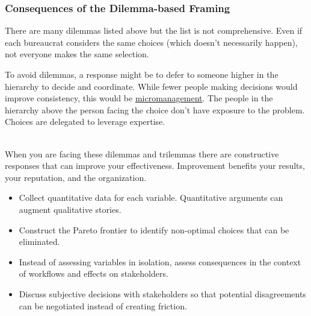 \subsubsection*{Consequences of the Dilemma-based Framing}

There are many dilemmas listed above but the list is not comprehensive. Even if each bureaucrat considers the same choices (which doesn't necessarily happen), not everyone makes the same selection. 

To avoid dilemmas, a response might be to defer to someone higher in the hierarchy to decide and coordinate. While fewer people making decisions would improve consistency, this would be \href{https://en.wikipedia.org/wiki/Micromanagement}{micromanagement}. 
The people in the hierarchy above the person facing the choice don't have exposure to the problem. Choices are delegated to leverage expertise. 

\ \\

When you are facing these dilemmas and trilemmas
there are constructive responses that can improve your effectiveness. Improvement benefits your results, your reputation, and the organization. 
\begin{itemize}
    \item Collect quantitative data for each variable. Quantitative arguments can augment qualitative stories. 
    \item Construct the Pareto frontier to identify non-optimal choices that can be eliminated.
    \item Instead of assessing variables in isolation, assess consequences in the context of workflows and effects on stakeholders.
    \item Discuss subjective decisions with stakeholders so that potential disagreements can be negotiated instead of creating friction.
\end{itemize}
 

